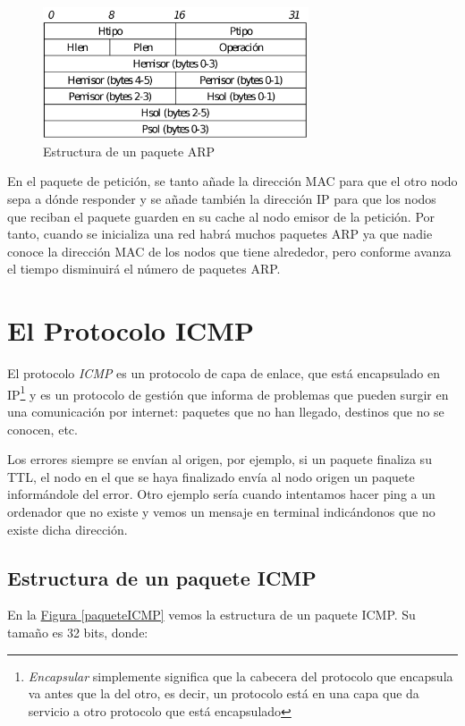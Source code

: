 \documentclass[10pt,a4paper,spanish]{report}
\begin{document}
\begin{figure}[!h]
  \centering
  \includegraphics[width=0.7\textwidth]{paqueteARP}
  \caption{Estructura de un paquete ARP}
  \label{paqueteARP}
\end{figure}

En el paquete de petición, se tanto añade la dirección MAC para que el otro nodo sepa a dónde responder  y se añade también la dirección IP para que los nodos que reciban el paquete guarden en su cache al nodo emisor de la petición. Por tanto, cuando se inicializa una red habrá muchos paquetes ARP ya que nadie conoce la dirección MAC de los nodos que tiene alrededor, pero conforme avanza el tiempo disminuirá el número de paquetes ARP.

\section{\textcolor{tema4}El Protocolo ICMP}
El protocolo \textit{\textcolor{tema4}{ICMP}} es un protocolo de capa de enlace, que está encapsulado en IP\footnote{\textit{\textcolor{tema4}{Encapsular}} simplemente significa que la cabecera del protocolo que encapsula va antes que la del otro, es decir, un protocolo está en una capa que da servicio a otro protocolo que está encapsulado} y es un protocolo de gestión que informa de problemas que pueden surgir en una comunicación por internet: paquetes que no han llegado, destinos que no se conocen, etc.

Los errores siempre se envían al origen, por ejemplo, si un paquete finaliza su TTL, el nodo en el que se haya finalizado envía al nodo origen un paquete informándole del error. Otro ejemplo sería cuando intentamos hacer ping a un ordenador que no existe y vemos un mensaje en terminal indicándonos que no existe dicha dirección.

\subsection{\textcolor{tema4}Estructura de un paquete ICMP}
En la \hyperref[paqueteICMP]{Figura \ref*{paqueteICMP}} vemos la estructura de un paquete ICMP. Su tamaño es 32 bits, donde:
\end{document}
